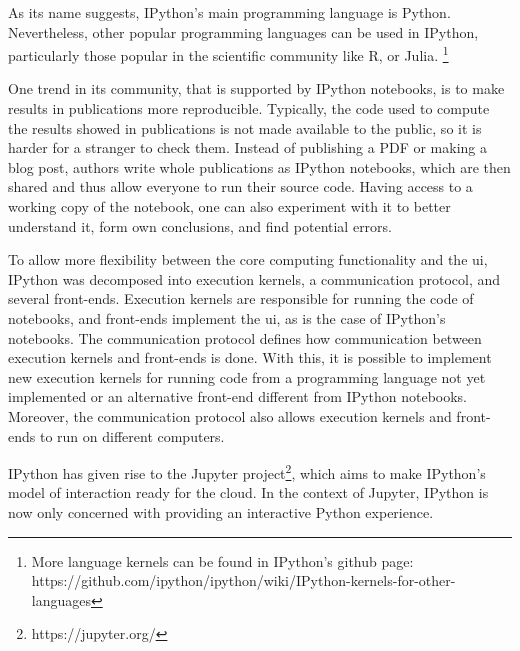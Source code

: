 As its name suggests, IPython's main programming language is Python.
Nevertheless, other popular programming languages can be used in IPython, particularly those popular in the scientific community like R, or Julia.%
\footnote{More language kernels can be found in IPython's github page: https://github.com/ipython/ipython/wiki/IPython-kernels-for-other-languages}

One trend in its community, that is supported by IPython notebooks, is to make results in publications more reproducible.
Typically, the code used to compute the results showed in publications is not made available to the public, so it is harder for a stranger to check them.
Instead of publishing a PDF or making a blog post, authors write whole publications as IPython notebooks, which are then shared and thus allow everyone to run their source code.
Having access to a working copy of the notebook, one can also experiment with it to better understand it, form own conclusions, and find potential errors.

To allow more flexibility between the core computing functionality and the \gls{ui}, IPython was decomposed into execution kernels, a communication protocol, and several front-ends.
Execution kernels are responsible for running the code of notebooks, and front-ends implement the \gls{ui}, as is the case of IPython's notebooks.
The communication protocol defines how communication between execution kernels and front-ends is done.
With this, it is possible to implement new execution kernels for running code from a programming language not yet implemented or an alternative front-end different from IPython notebooks.
Moreover, the communication protocol also allows execution kernels and front-ends to run on different computers\cite{PER-GRA:2007}.

IPython has given rise to the Jupyter project\footnote{https://jupyter.org/}, which aims to make IPython's model of interaction ready for the cloud.
In the context of Jupyter, IPython is now only concerned with providing an interactive Python experience.

